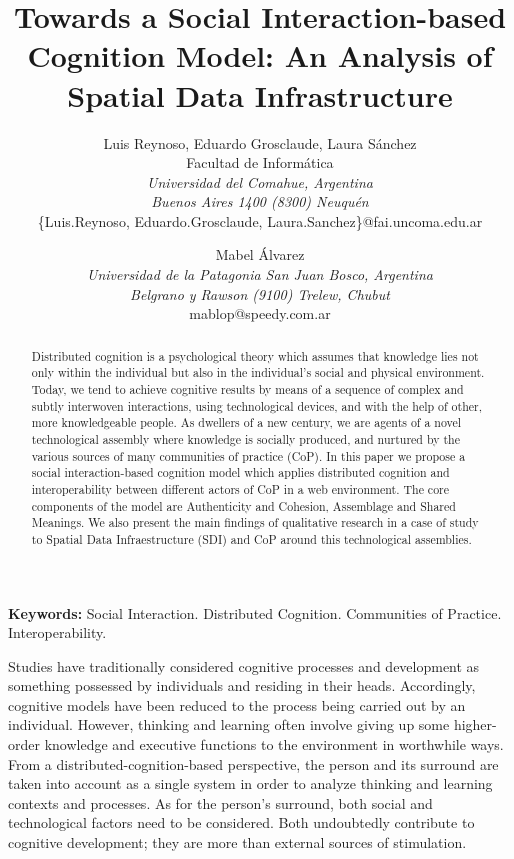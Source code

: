 \documentclass[10pt,twocolumn,ieeetran]{article}
\title{Towards a Social Interaction-based Cognition Model: An Analysis of Spatial Data Infrastructure}
\author{Luis Reynoso, Eduardo Grosclaude, Laura S\' anchez \\
Facultad de Inform\' atica\\ {\it Universidad del Comahue, Argentina} \\
{\it Buenos Aires 1400 (8300) Neuqu\'en}\\ \{Luis.Reynoso, Eduardo.Grosclaude,  Laura.Sanchez\}@fai.uncoma.edu.ar\\
\and
Mabel \' Alvarez\\
{\it Universidad de la Patagonia San Juan Bosco, Argentina}\\
{\it Belgrano y Rawson (9100) Trelew, Chubut}\\
mablop@speedy.com.ar\\
}
\begin{document}
\maketitle
\thispagestyle{empty}




\begin{abstract}
Distributed cognition is a psychological theory which assumes that knowledge lies not only within the individual but also in the individual's social and physical environment. Today, we tend to achieve cognitive results by means of a sequence of complex and subtly interwoven interactions, using  technological devices, and with the help of other, more knowledgeable people. As dwellers of a new century, we are agents of a novel technological assembly where knowledge is socially produced, and nurtured by the various sources of many communities of practice (CoP). In this paper we propose a social interaction-based cognition model which applies distributed cognition and interoperability between different actors of CoP in a web environment. The core components of the model are Authenticity and Cohesion, Assemblage and Shared Meanings. We also present the main findings of qualitative research in a case of study to Spatial Data Infraestructure (SDI) and CoP around this technological assemblies. 

\end{abstract}

{\bf Keywords:} Social Interaction. Distributed Cognition. Communities of Practice. Interoperability. 




Studies have traditionally considered cognitive processes \cite {Wang2005} and development as something possessed by individuals and residing in their heads. Accordingly, cognitive models have been reduced to the process being carried out by an individual.  
However, thinking and learning often involve giving up some higher-order knowledge and executive functions to the environment in worthwhile ways. 
From a distributed-cognition-based perspective, 
the person and its surround are taken into account as a single system 
in order to analyze  thinking and learning contexts and processes. 
As for the person's surround, both social and technological factors need to be considered. Both undoubtedly contribute to cognitive development; they are more than external sources of stimulation.
\end{document}
